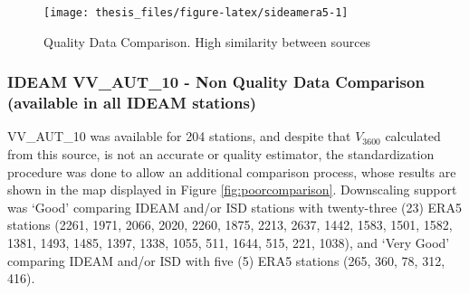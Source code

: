 \documentclass[12pt,oneside]{reedthesis}
\begin{document}
\begin{figure}

{\centering \texttt{[image: thesis\_files/figure-latex/sideamera5-1]} 

}

\caption{Quality Data Comparison. High similarity between sources}\label{fig:sideamera5}
\end{figure}
\hypertarget{ideam-vv_aut_10---non-quality-data-comparison-available-in-all-ideam-stations}{%
\subsubsection{IDEAM VV\_AUT\_10 - Non Quality Data Comparison (available in all IDEAM stations)}\label{ideam-vv_aut_10---non-quality-data-comparison-available-in-all-ideam-stations}}

VV\_AUT\_10 was available for 204 stations, and despite that \(V_{3600}\) calculated from this source, is not an accurate or quality estimator, the standardization procedure was done to allow an additional comparison process, whose results are shown in the map displayed in Figure \ref{fig:poorcomparison}. Downscaling support was `Good' comparing IDEAM and/or ISD stations with twenty-three (23) ERA5 stations (2261, 1971, 2066, 2020, 2260, 1875, 2213, 2637, 1442, 1583, 1501, 1582, 1381, 1493, 1485, 1397, 1338, 1055, 511, 1644, 515, 221, 1038), and `Very Good' comparing IDEAM and/or ISD with five (5) ERA5 stations (265, 360, 78, 312, 416).
\end{document}
